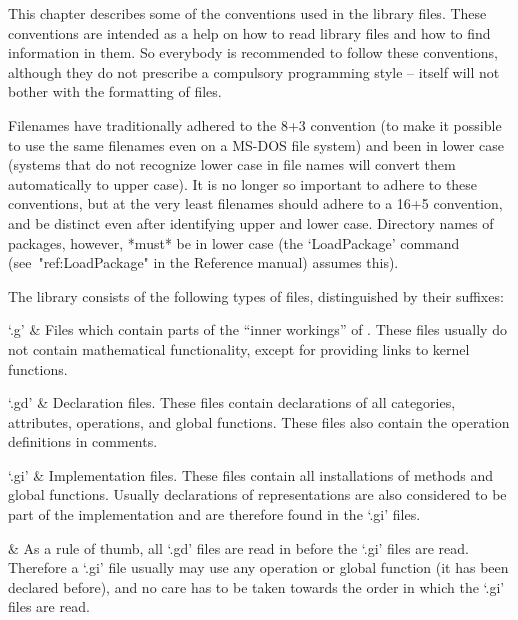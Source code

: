 

This chapter describes some of the conventions used in the {\GAP}
library files.
These conventions are intended as a help on how to read library files and
how to find information in them.
So everybody is recommended to follow these conventions,
although they do not prescribe a compulsory programming style
-- {\GAP} itself will not bother with the formatting of files.

Filenames have traditionally {\GAP} adhered to the 8+3 convention (to make it
possible to use the same filenames even on a MS-DOS file system) and been in
lower case (systems that do not recognize lower case in file names will
convert them automatically to upper case). It is no longer so important to 
adhere to these conventions, but at the very least filenames should adhere
to a 16+5 convention, and be distinct even after identifying upper and lower
case. Directory names of packages, however, *must* be in lower case (the
`LoadPackage' command (see~"ref:LoadPackage" in the Reference manual)
assumes this).


The {\GAP} library consists of the following types of files, distinguished
by their suffixes:

\beginitems
`.g' &
    Files which contain parts of the ``inner workings'' of {\GAP}.
    These files usually do not contain mathematical functionality,
    except for providing links to kernel functions.

`.gd' &
    Declaration files.
    These files contain declarations of all categories, attributes,
    operations, and global functions.
    These files also contain the operation definitions in comments.

`.gi' &
    Implementation files.
    These files contain all installations of methods and global functions.
    Usually declarations of representations are also considered to be
    part of the implementation and are therefore found in the `.gi' files.

    &
    As a rule of thumb, all `.gd' files are read in before the `.gi' files
    are read.
    Therefore a `.gi' file usually may use any operation or global function
    (it has been declared before),
    and no care has to be taken towards the order in which the `.gi' files
    are read.

